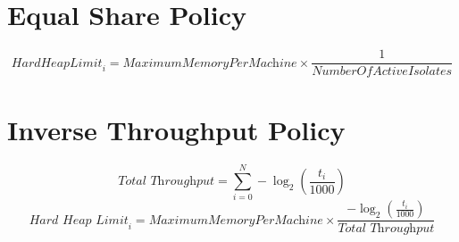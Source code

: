 \documentclass{l4proj}
\begin{document}
\section{Equal Share Policy}
\begin{equation}
\textit{HardHeapLimit}_i = \textit{MaximumMemoryPerMachine} \times \frac{1}{\textit{NumberOfActiveIsolates}}
\end{equation}
\section{Inverse Throughput Policy}
\begin{equation}
\textit{Total Throughput} = \sum_{i=0}^{N} -\log_2(\frac{t_i}{1000})
\end{equation}
\begin{equation}
\textit{Hard Heap Limit}_i = \textit{MaximumMemoryPerMachine} \times \frac{-\log_2(\frac{t_i}{1000})}{\textit{Total Throughput}}
\end{equation}
\end{document}
